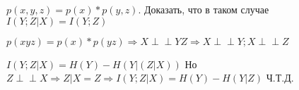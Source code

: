\documentclass[../main.tex]{subfiles}
\begin{document}
\newcommand{\indep}{\perp \!\!\! \perp}
$p(x,y,z) = p(x)*p(y,z)$. Доказать, что в таком случае $I(Y;Z|X) = I(Y;Z)$

$p(xyz)=p(x)*p(yz) \Rightarrow X \indep YZ \Rightarrow X \indep Y; X \indep Z$

$I(Y; Z|X) = H(Y) - H(Y|(Z|X))$ Но $Z \indep X \Rightarrow Z|X = Z \Rightarrow I(Y; Z|X) = H(Y) - H(Y|Z)$ Ч.Т.Д.
\end{document}
